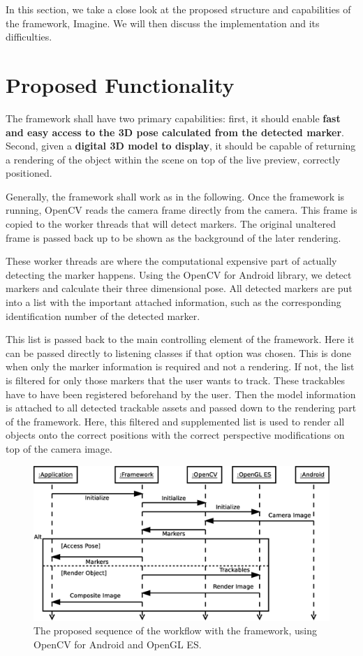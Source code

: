 
In this section, we take a close look at the proposed structure and capabilities of the framework, Imagine.
We will then discuss the implementation and its difficulties.

\section{Proposed Functionality}

The framework shall have two primary capabilities: first, it should enable \textbf{fast and easy access to the 3D pose calculated from the detected marker}.
Second, given a \textbf{digital 3D model to display}, it should be capable of returning a rendering of the object within the scene on top of the live preview, correctly positioned.

Generally, the framework shall work as in the following.
Once the framework is running, OpenCV reads the camera frame directly from the camera.
This frame is copied to the worker threads that will detect markers.
The original unaltered frame is passed back up to be shown as the background of the later rendering.

These worker threads are where the computational expensive part of actually detecting the marker happens.
Using the OpenCV for Android library, we detect markers and calculate their three dimensional pose.
All detected markers are put into a list with the important attached information, such as the corresponding identification number of the detected marker.

This list is passed back to the main controlling element of the framework.
Here it can be passed directly to listening classes if that option was chosen.
This is done when only the marker information is required and not a rendering.
If not, the list is filtered for only those markers that the user wants to track.
These trackables have to have been registered beforehand by the user.
Then the model information is attached to all detected trackable assets and passed down to the rendering part of the framework.
Here, this filtered and supplemented list is used to render all objects onto the correct positions with the correct perspective modifications on top of the camera image.

\begin{figure}[H]
	\centering
	\includegraphics[width=12cm]{img/sequence_access.eps}
	\caption[Access Sequence.]{The proposed sequence of the workflow with the framework, using OpenCV for Android and OpenGL ES.}
	\label{fig:sequence_access}
\end{figure}

